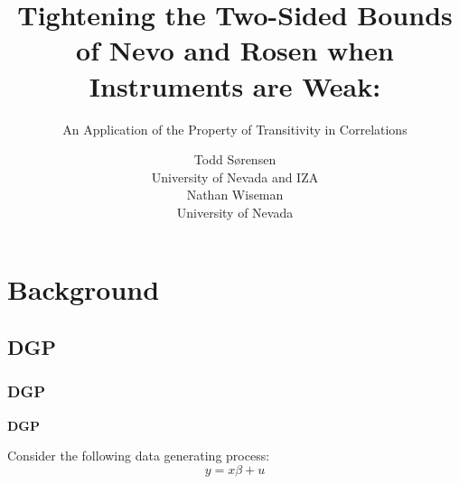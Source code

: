 \documentclass{beamer}
\begin{document}


\title[Intransitivity in Correlations]{Tightening the Two-Sided Bounds of Nevo and Rosen when Instruments are Weak:}
\subtitle{An Application of the Property of Transitivity in Correlations}
	\author[S\o rensen Wiseman]
		{Todd S\o rensen \\ University of Nevada and IZA \\
		\medskip
		Nathan Wiseman \\ University of Nevada}
	\maketitle

\section{Background}

\subsection{DGP}

\begin{frame}
\frametitle{DGP}
\textbf{DGP} \\ \medskip \pause

Consider the following data generating process: \\

\begin{equation*}
y=x\beta+u
\end{equation*}

\end{frame}
\end{document}
